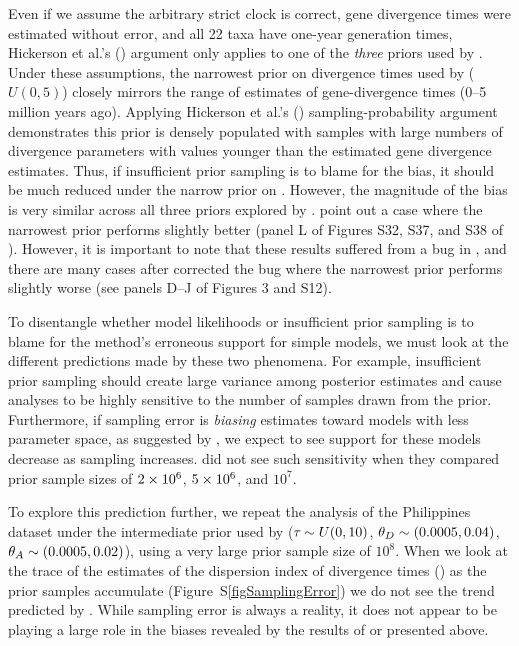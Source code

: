 Even if we assume the arbitrary strict clock is correct, gene divergence times
were estimated without error, and all 22 taxa have one-year generation times,
Hickerson et al.'s
(\citeyear{Hickerson2013}) argument only applies to one of the \emph{three}
priors used by \citet{Oaks2012}.
Under these assumptions, the narrowest prior on divergence times used by
\citet{Oaks2012} ($U(0, 5)$) closely mirrors the range of estimates of
gene-divergence times (0--5 million years ago).
Applying Hickerson et al.'s (\citeyear{Hickerson2013}) sampling-probability
argument demonstrates this prior is densely populated with samples with large
numbers of divergence parameters with values younger than the estimated gene
divergence estimates.
Thus, if insufficient prior sampling is to blame for the bias, it should be
much reduced under the narrow prior on \divt{}.
However, the magnitude of the bias is very similar across all three priors
explored by \citet{Oaks2012}.
\citet{Hickerson2013} point out a case where the narrowest prior performs
slightly better (panel L of Figures S32, S37, and S38 of \citet{Oaks2012}).
However, it is important to note that these results suffered from a bug
in \msb, and there are many cases after \citet{Oaks2012} corrected the 
bug where the narrowest prior performs slightly worse (see panels D--J of
Figures 3 and S12).

To disentangle whether model likelihoods or insufficient prior sampling is to
blame for the method's erroneous support for simple models, we must look at the
different predictions made by these two phenomena.
For example, insufficient prior sampling should create large variance among
posterior estimates and cause analyses to be highly sensitive to the number of
samples drawn from the prior.
Furthermore, if sampling error is \emph{biasing} estimates toward models with
less parameter space, as suggested by \citet{Hickerson2013}, we expect to see
support for these models decrease as sampling increases.
\citet{Oaks2012} did not see such sensitivity when they compared prior sample
sizes of $2\times 10^{6}$, $5\times 10^{6}$, and $10^7$.

To explore this prediction further, we repeat the analysis of the Philippines
dataset under the intermediate prior used by \citet{Oaks2012} ($\tau_{} \sim
U(0, 10)$, $\meanDescendantTheta{} \sim (0.0005, 0.04)$, $\ancestralTheta{}
\sim (0.0005, 0.02)$), using a very large prior sample size of $10^8$.
When we look at the trace of the estimates of the dispersion index of
divergence times (\vmratio{}) as the prior samples accumulate
(Figure~S\ref{figSamplingError}) we do not see the trend predicted by
\citet{Hickerson2013}.
While sampling error is always a reality, it does not appear to be playing a
large role in the biases revealed by the results of \citet{Oaks2012} or
presented above.

